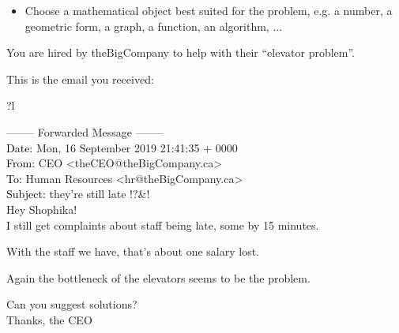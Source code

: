\begin{annotation}
	\begin{goals}
		\begin{itemize}
			\item Choose a mathematical object best suited for the problem, e.g. a number, a geometric form, a graph, a function, an algorithm, ...

		\end{itemize}
	\end{goals}
%		
%
\end{annotation}


You are hired by theBigCompany to help with their ``elevator problem''.

This is the email you received:

\begin{center}
	\color{blue}
	\begin{tabular}{?l}
	\begin{minipage}{.75\textwidth}
	-------- Forwarded Message -------- \\[10pt]
	\textcolor{black}{Date: } Mon, 16 September 2019 21:41:35 + 0000  \\
	\textcolor{black}{From: } CEO <theCEO@theBigCompany.ca> \\
	\textcolor{black}{To: } Human Resources <hr@theBigCompany.ca> \\
	\textcolor{black}{Subject: } they're still late !?\@\&! \\
	
	Hey Shophika! \\
	
	I still get complaints about staff being late, some by 15 minutes.
	
	With the staff we have, that's about one salary lost.
	
	Again the bottleneck of the elevators seems to be the problem.
	
	Can you suggest solutions? \\
	
	Thanks, the CEO
	\end{minipage}
	\end{tabular}
\end{center}


